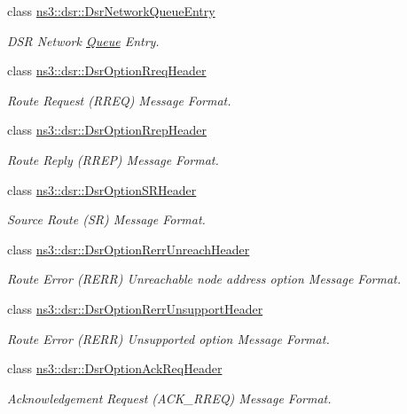 \begin{DoxyCompactItemize}
class \hyperlink{classns3_1_1dsr_1_1DsrNetworkQueueEntry}{ns3\+::dsr\+::\+Dsr\+Network\+Queue\+Entry}
\begin{DoxyCompactList}\small\item\em D\+SR Network \hyperlink{classns3_1_1Queue}{Queue} Entry. \end{DoxyCompactList}\item 
class \hyperlink{classns3_1_1dsr_1_1DsrOptionRreqHeader}{ns3\+::dsr\+::\+Dsr\+Option\+Rreq\+Header}
\begin{DoxyCompactList}\small\item\em Route Request (R\+R\+EQ) Message Format. \end{DoxyCompactList}\item 
class \hyperlink{classns3_1_1dsr_1_1DsrOptionRrepHeader}{ns3\+::dsr\+::\+Dsr\+Option\+Rrep\+Header}
\begin{DoxyCompactList}\small\item\em Route Reply (R\+R\+EP) Message Format. \end{DoxyCompactList}\item 
class \hyperlink{classns3_1_1dsr_1_1DsrOptionSRHeader}{ns3\+::dsr\+::\+Dsr\+Option\+S\+R\+Header}
\begin{DoxyCompactList}\small\item\em Source Route (SR) Message Format. \end{DoxyCompactList}\item 
class \hyperlink{classns3_1_1dsr_1_1DsrOptionRerrUnreachHeader}{ns3\+::dsr\+::\+Dsr\+Option\+Rerr\+Unreach\+Header}
\begin{DoxyCompactList}\small\item\em Route Error (R\+E\+RR) Unreachable node address option Message Format. \end{DoxyCompactList}\item 
class \hyperlink{classns3_1_1dsr_1_1DsrOptionRerrUnsupportHeader}{ns3\+::dsr\+::\+Dsr\+Option\+Rerr\+Unsupport\+Header}
\begin{DoxyCompactList}\small\item\em Route Error (R\+E\+RR) Unsupported option Message Format. \end{DoxyCompactList}\item 
class \hyperlink{classns3_1_1dsr_1_1DsrOptionAckReqHeader}{ns3\+::dsr\+::\+Dsr\+Option\+Ack\+Req\+Header}
\begin{DoxyCompactList}\small\item\em Acknowledgement Request (A\+C\+K\+\_\+\+R\+R\+EQ) Message Format. \end{DoxyCompactList}\item 

\end{DoxyCompactItemize}
